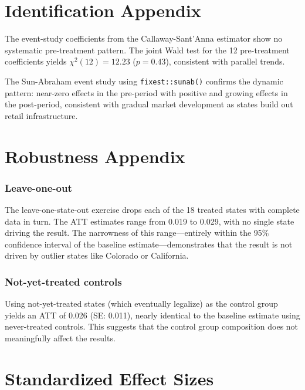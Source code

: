\documentclass[12pt]{article}
\begin{document}
\section{Identification Appendix}

The event-study coefficients from the Callaway-Sant'Anna estimator show no systematic pre-treatment pattern. The joint Wald test for the 12 pre-treatment coefficients yields $\chi^2(12) = 12.23$ ($p = 0.43$), consistent with parallel trends.

The Sun-Abraham event study using \texttt{fixest::sunab()} confirms the dynamic pattern: near-zero effects in the pre-period with positive and growing effects in the post-period, consistent with gradual market development as states build out retail infrastructure.

\section{Robustness Appendix}

\subsubsection*{Leave-one-out} The leave-one-state-out exercise drops each of the 18 treated states with complete data in turn. The ATT estimates range from 0.019 to 0.029, with no single state driving the result. The narrowness of this range---entirely within the 95\% confidence interval of the baseline estimate---demonstrates that the result is not driven by outlier states like Colorado or California.

\subsubsection*{Not-yet-treated controls} Using not-yet-treated states (which eventually legalize) as the control group yields an ATT of 0.026 (SE: 0.011), nearly identical to the baseline estimate using never-treated controls. This suggests that the control group composition does not meaningfully affect the results.

\section{Standardized Effect Sizes}
\label{sec:sde}


\end{document}
